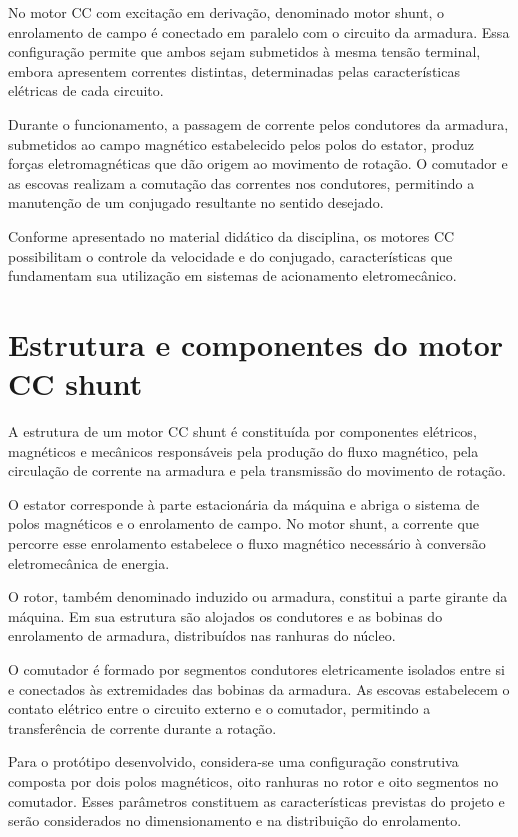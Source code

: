 \documentclass[12pt,openright,oneside,a4paper,brazilian]{abntex2}
\begin{document}
No motor CC com excitação em derivação, denominado motor shunt, o enrolamento de campo é conectado em paralelo com o circuito da armadura. Essa configuração permite que ambos sejam submetidos à mesma tensão terminal, embora apresentem correntes distintas, determinadas pelas características elétricas de cada circuito.

Durante o funcionamento, a passagem de corrente pelos condutores da armadura, submetidos ao campo magnético estabelecido pelos polos do estator, produz forças eletromagnéticas que dão origem ao movimento de rotação. O comutador e as escovas realizam a comutação das correntes nos condutores, permitindo a manutenção de um conjugado resultante no sentido desejado.

Conforme apresentado no material didático da disciplina, os motores CC possibilitam o controle da velocidade e do conjugado, características que fundamentam sua utilização em sistemas de acionamento eletromecânico.
\section{Estrutura e componentes do motor CC shunt}
A estrutura de um motor CC shunt é constituída por componentes elétricos, magnéticos e mecânicos responsáveis pela produção do fluxo magnético, pela circulação de corrente na armadura e pela transmissão do movimento de rotação.

O estator corresponde à parte estacionária da máquina e abriga o sistema de polos magnéticos e o enrolamento de campo. No motor shunt, a corrente que percorre esse enrolamento estabelece o fluxo magnético necessário à conversão eletromecânica de energia.

O rotor, também denominado induzido ou armadura, constitui a parte girante da máquina. Em sua estrutura são alojados os condutores e as bobinas do enrolamento de armadura, distribuídos nas ranhuras do núcleo.

O comutador é formado por segmentos condutores eletricamente isolados entre si e conectados às extremidades das bobinas da armadura. As escovas estabelecem o contato elétrico entre o circuito externo e o comutador, permitindo a transferência de corrente durante a rotação.

Para o protótipo desenvolvido, considera-se uma configuração construtiva composta por dois polos magnéticos, oito ranhuras no rotor e oito segmentos no comutador. Esses parâmetros constituem as características previstas do projeto e serão considerados no dimensionamento e na distribuição do enrolamento.
\end{document}
